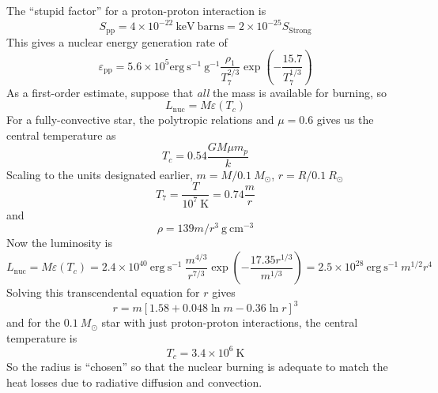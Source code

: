 \documentclass[10pt]{article}
\numberwithin{equation}{section}
\begin{document}
  The ``stupid factor'' for a proton-proton interaction is
  \begin{equation}
    \label{eq:155}
    S_{\mathrm{pp}}=4\times 10^{-22}\ \mathrm{keV\ barns}=2\times
    10^{-25}S_{\mathrm{Strong}}
  \end{equation}
  This gives a nuclear energy generation rate of
  \begin{equation}
    \label{eq:307}
    \varepsilon_{\mathrm{pp}}=5.6\times 10^5 \mathrm{erg\ s^{-1}\ g^{-1}}\frac{\rho_1}{T_7^{2/3}}\exp\left(-\frac{15.7}{T_7^{1/3}}\right)
  \end{equation}
  As a first-order estimate, suppose that \emph{all} the mass is
  available for burning, so 
  \begin{equation}
    \label{eq:156}
    L_{\mathrm{nuc}}=M\varepsilon(T_c)
  \end{equation}
  For a fully-convective star, the polytropic relations and $\mu=0.6$
  gives us the central temperature as
  \begin{equation}
    \label{eq:157}
    T_c=0.54\frac{GM\mu m_p}{k}
  \end{equation}
  Scaling to the units designated earlier, $m=M/0.1\ M_\odot$,
  $r=R/0.1\ R_\odot$
  \begin{equation}
    \label{eq:158}
    T_7=\frac{T}{10^7\ \mathrm{K}}=0.74\frac{m}{r}
  \end{equation}
  and
  \begin{equation}
    \label{eq:159}
    \rho=139 m/r^3\ \mathrm{g\ cm^{-3}}
  \end{equation}
  Now the luminosity is
  \begin{equation}
    \label{eq:160}
    L_{\mathrm{nuc}}=M\varepsilon(T_c)=2.4\times 10^{40}\ \mathrm{erg\
      s^{-1}}\ \frac{m^{4/3}}{r^{7/3}}\exp\left(-\frac{17.35
        r^{1/3}}{m^{1/3}}\right)=2.5\times 10^{28}\ \mathrm{erg\ s^{-1}}\ 
m^{1/2}r^4
  \end{equation}
  Solving this transcendental equation for $r$ gives
  \begin{equation}
    \label{eq:161}
    r=m\left[1.58+0.048\ln m-0.36\ln r\right]^3
  \end{equation}
  and for the $0.1\ M_\odot$ star with just proton-proton
  interactions, the central temperature is
  \begin{equation}
    \label{eq:162}
    T_c=3.4\times 10^6\ \mathrm{K}
  \end{equation}
  So the radius is ``chosen'' so that the nuclear burning is adequate
  to match the heat losses due to radiative diffusion and
  convection.\\
\end{document}

